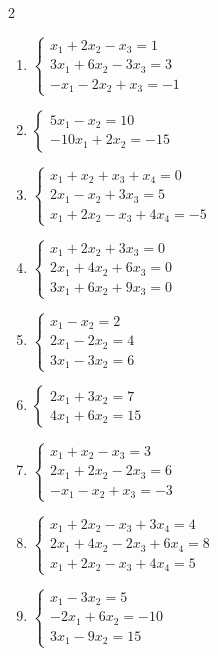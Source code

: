 \begin{multicols}{2}
\begin{enumerate}[label=\arabic*., leftmargin=*]
\item $\begin{cases}x_1+2x_2-x_3=1\\3x_1+6x_2-3x_3=3\\-x_1-2x_2+x_3=-1\end{cases}$

\item $\begin{cases}5x_1-x_2=10\\-10x_1+2x_2=-15\end{cases}$

\item $\begin{cases}x_1+x_2+x_3+x_4=0\\2x_1-x_2+3x_3=5\\x_1+2x_2-x_3+4x_4=-5\end{cases}$

\item $\begin{cases}x_1+2x_2+3x_3=0\\2x_1+4x_2+6x_3=0\\3x_1+6x_2+9x_3=0\end{cases}$

\item $\begin{cases}x_1-x_2=2\\2x_1-2x_2=4\\3x_1-3x_2=6\end{cases}$

\item $\begin{cases}2x_1+3x_2=7\\4x_1+6x_2=15\end{cases}$

\item $\begin{cases}x_1+x_2-x_3=3\\2x_1+2x_2-2x_3=6\\-x_1-x_2+x_3=-3\end{cases}$

\item $\begin{cases}x_1+2x_2-x_3+3x_4=4\\2x_1+4x_2-2x_3+6x_4=8\\x_1+2x_2-x_3+4x_4=5\end{cases}$

\item $\begin{cases}x_1-3x_2=5\\-2x_1+6x_2=-10\\3x_1-9x_2=15\end{cases}$


\end{enumerate}
\end{multicols}
